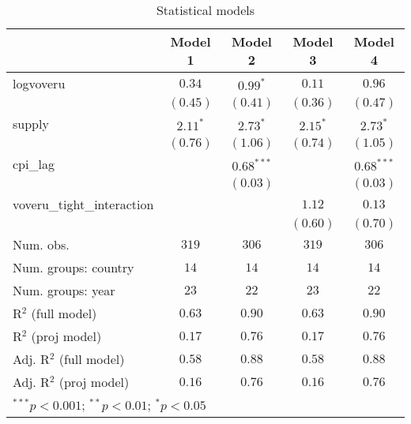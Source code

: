 
\begin{table}
\begin{center}
\begin{tabular}{l c c c c}
\hline
 & Model 1 & Model 2 & Model 3 & Model 4 \\
\hline
logvoveru                  & $0.34$     & $0.99^{*}$   & $0.11$     & $0.96$       \\
                           & $(0.45)$   & $(0.41)$     & $(0.36)$   & $(0.47)$     \\
supply                     & $2.11^{*}$ & $2.73^{*}$   & $2.15^{*}$ & $2.73^{*}$   \\
                           & $(0.76)$   & $(1.06)$     & $(0.74)$   & $(1.05)$     \\
cpi\_lag                   &            & $0.68^{***}$ &            & $0.68^{***}$ \\
                           &            & $(0.03)$     &            & $(0.03)$     \\
voveru\_tight\_interaction &            &              & $1.12$     & $0.13$       \\
                           &            &              & $(0.60)$   & $(0.70)$     \\
\hline
Num. obs.                  & $319$      & $306$        & $319$      & $306$        \\
Num. groups: country       & $14$       & $14$         & $14$       & $14$         \\
Num. groups: year          & $23$       & $22$         & $23$       & $22$         \\
R$^2$ (full model)         & $0.63$     & $0.90$       & $0.63$     & $0.90$       \\
R$^2$ (proj model)         & $0.17$     & $0.76$       & $0.17$     & $0.76$       \\
Adj. R$^2$ (full model)    & $0.58$     & $0.88$       & $0.58$     & $0.88$       \\
Adj. R$^2$ (proj model)    & $0.16$     & $0.76$       & $0.16$     & $0.76$       \\
\hline
\multicolumn{5}{l}{\scriptsize{$^{***}p<0.001$; $^{**}p<0.01$; $^{*}p<0.05$}}
\end{tabular}
\caption{Statistical models}
\label{table:coefficients}
\end{center}
\end{table}
